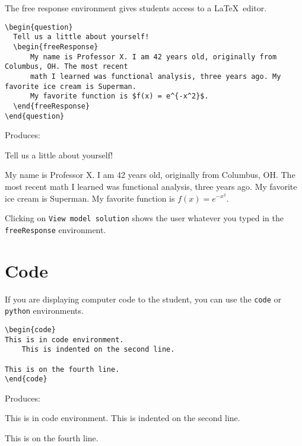 \documentclass{ximera}
\begin{document}
\begin{example}The free response environment gives students access to a \LaTeX\ editor. 

\begin{verbatim}
\begin{question}
  Tell us a little about yourself!
  \begin{freeResponse}
      My name is Professor X. I am 42 years old, originally from Columbus, OH. The most recent 
      math I learned was functional analysis, three years ago. My favorite ice cream is Superman. 
      My favorite function is $f(x) = e^{-x^2}$.
  \end{freeResponse}
\end{question}
\end{verbatim}

Produces:

\begin{question}
  Tell us a little about yourself!
  \begin{freeResponse}
      My name is Professor X. I am 42 years old, originally from Columbus, OH. The most recent 
      math I learned was functional analysis, three years ago. My favorite ice cream is Superman. 
      My favorite function is $f(x) = e^{-x^2}.$
  \end{freeResponse}
\end{question}

\begin{remark}
Clicking on \verb!View model solution! shows the user
whatever you typed in the  \verb!freeResponse! environment.
\end{remark}
\end{example}

\section{Code} \label{CodeAnswers}

\begin{example}
If you are displaying computer code to the student, you can use the \verb!code! or \verb!python! environments.

\begin{verbatim}
\begin{code}
This is in code environment.
    This is indented on the second line.

This is on the fourth line.
\end{code}
\end{verbatim}

Produces:

\begin{code}
This is in code environment.
    This is indented on the second line.

This is on the fourth line.
\end{code}
\end{example}
\end{document}
